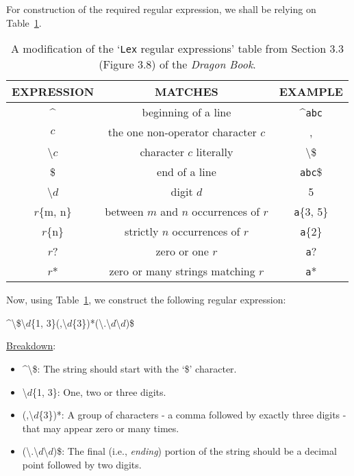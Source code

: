 \documentclass[addpoints]{exam}
\begin{document}
\begin{questions}
  \begin{solution}
    For construction of the required regular expression, we shall be relying on Table~\ref{tab:Table 1}.
    \begin{table}[H]
      \begin{center}
          \begin{tabular}{ |c|c|c| } 
              \hline
              \hline
              EXPRESSION & MATCHES & EXAMPLE \\ 
              \hline
              \^{} & beginning of a line & \^{}\texttt{abc} \\
              \hline
              \(c\) & the one non-operator character \(c\) & , \\
              \hline
              \textbackslash \(c\) & character \(c\) literally & \textbackslash \$ \\
              \hline 
              \$ & end of a line & \texttt{abc}\$ \\
              \hline
              \textbackslash \(d\) & digit \(d\) & 5 \\
              \hline 
              \(r\)\{m, n\} & between \(m\) and \(n\) occurrences of \(r\) & \texttt{a}\{3, 5\} \\
              \hline
              \(r\)\{n\} & strictly \(n\) occurrences of \(r\) & \texttt{a}\{2\}\\
              \hline
              \(r\)? & zero or one \(r\) & \texttt{a}? \\
              \hline
              \(r\)* & zero or many strings matching \(r\) & \texttt{a}* \\
              \hline
          \end{tabular}
      \end{center}
      \caption{\label{tab:Table 1}A modification of the `\texttt{Lex} regular expressions' table from Section 3.3 (Figure 3.8) of the \textit{Dragon Book}.}
  \end{table}
  Now, using Table~\ref{tab:Table 1}, we construct the following regular expression:
  
  \begin{center}
    \^{}\textbackslash\$\textbackslash \(d\)\{1, 3\}(,\textbackslash \(d\)\{3\})*(\textbackslash .\textbackslash \(d\)\textbackslash \(d\))\$
  \end{center}
  
  \underline{Breakdown}:
  \begin{itemize}
    \item \^{}\textbackslash\$: The string should start with the `\$' character.
    \item \textbackslash \(d\)\{1, 3\}: One, two or three digits.
    \item (,\textbackslash \(d\)\{3\})*: A group of characters - a comma followed by exactly three digits - that may appear zero or many times.
    \item (\textbackslash .\textbackslash \(d\)\textbackslash \(d\))\$: The final (i.e., \textit{ending}) portion of the string should be a decimal point followed by two digits.
  \end{itemize}
\end{solution}
\end{questions}
\end{document}
